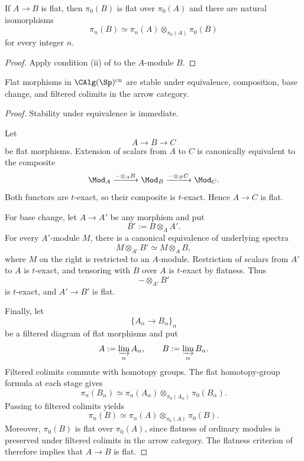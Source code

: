 \begin{proposition}
\label{prop:homotopy-groups-flat-algebra}
If $A\to B$ is flat, then $\pi_0(B)$ is flat over $\pi_0(A)$ and there are
natural isomorphisms
\[
    \pi_n(B)
    \simeq
    \pi_n(A)
    \otimes_{\pi_0(A)}
    \pi_0(B)
\]
for every integer $n$.
\end{proposition}

\begin{proof}
Apply condition (ii) of  to the $A$-module $B$.
\end{proof}

\begin{proposition}
\label{prop:flat-algebra-permanence}
Flat morphisms in $\CAlg(\Sp)^{\mathrm{cn}}$ are stable under equivalence,
composition, base change, and filtered colimits in the arrow category.
\end{proposition}\begin{proof}
Stability under equivalence is immediate.

Let
\[
    A
    \longrightarrow
    B
    \longrightarrow
    C
\]
be flat morphisms. Extension of scalars from $A$ to $C$ is canonically
equivalent to the composite
\[
    \Mod_A
    \xrightarrow{-\otimes_AB}
    \Mod_B
    \xrightarrow{-\otimes_BC}
    \Mod_C.
\]
Both functors are $t$-exact, so their composite is $t$-exact. Hence
$A\to C$ is flat.

For base change, let $A\to A'$ be any morphism and put
\[
    B'
    :=
    B\otimes_AA'.
\]
For every $A'$-module $M$, there is a canonical equivalence of underlying
spectra
\[
    M\otimes_{A'}B'
    \simeq
    M\otimes_AB,
\]
where $M$ on the right is restricted to an $A$-module. Restriction of
scalars from $A'$ to $A$ is $t$-exact, and tensoring with $B$ over $A$ is
$t$-exact by flatness. Thus
\[
    -\otimes_{A'}B'
\]
is $t$-exact, and $A'\to B'$ is flat.

Finally, let
\[
    \{A_\alpha\to B_\alpha\}_{\alpha}
\]
be a filtered diagram of flat morphisms and put
\[
    A:=\varinjlim_\alpha A_\alpha,
    \qquad
    B:=\varinjlim_\alpha B_\alpha.
\]
Filtered colimits commute with homotopy groups. The flat homotopy-group
formula at each stage gives
\[
    \pi_n(B_\alpha)
    \simeq
    \pi_n(A_\alpha)
    \otimes_{\pi_0(A_\alpha)}
    \pi_0(B_\alpha).
\]
Passing to filtered colimits yields
\[
    \pi_n(B)
    \simeq
    \pi_n(A)
    \otimes_{\pi_0(A)}
    \pi_0(B).
\]
Moreover, $\pi_0(B)$ is flat over $\pi_0(A)$, since flatness of ordinary
modules is preserved under filtered colimits in the arrow category.
The flatness criterion of
 therefore implies that $A\to B$ is flat.
\end{proof}

